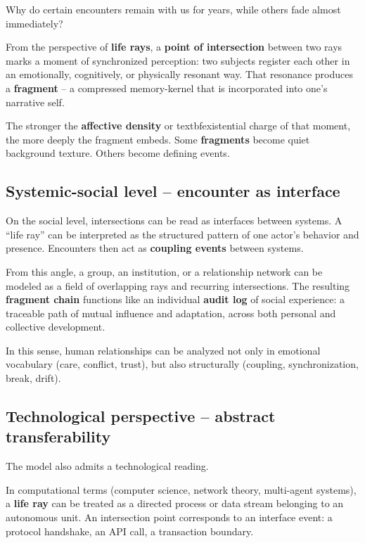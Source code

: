 Why do certain encounters remain with us for years, while others fade almost immediately?

From the perspective of \textbf{life rays},
a \textbf{point of intersection} between two rays marks a moment of synchronized perception:
two subjects register each other in an emotionally, cognitively, or physically resonant way.
That resonance produces a \textbf{fragment} -- a compressed memory-kernel
that is incorporated into one's narrative self.

The stronger the \textbf{affective density} or textbf{existential charge} of that moment,
the more deeply the fragment embeds. Some \textbf{fragments} become quiet background texture.
Others become defining events.


\subsection{Systemic-social level -- encounter as interface}

On the social level, intersections can be read as interfaces between systems.
A ``life ray'' can be interpreted as the structured pattern of one actor's behavior and presence.
Encounters then act as \textbf{coupling events}  between systems.

From this angle, a group, an institution, or a relationship network can be modeled as a field of overlapping rays and recurring intersections.
The resulting \textbf{fragment chain} functions like an individual \textbf{audit log} of social experience:
a traceable path of mutual influence and adaptation, across both personal and collective development.

In this sense, human relationships can be analyzed not only in emotional vocabulary (care, conflict, trust),
but also structurally (coupling, synchronization, break, drift).

\subsection{Technological perspective -- abstract transferability}

The model also admits a technological reading.

In computational terms (computer science, network theory, multi-agent systems),
a \textbf{life ray }can be treated as a directed process or data stream belonging to an autonomous unit.
An intersection point corresponds to an interface event: a protocol handshake, an API call, a transaction boundary.

